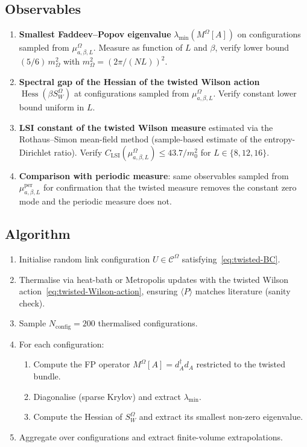 \documentclass[11pt,a4paper]{amsart}
\theoremstyle{definition}
\DeclareMathOperator{\Hess}{Hess}
\begin{document}
\subsection{Observables}
\begin{enumerate}[label=(O\arabic*),leftmargin=2em]
\item \textbf{Smallest Faddeev--Popov eigenvalue} $\lambda_{\min}(M^\Omega[A])$
on configurations sampled from $\mu^\Omega_{a,\beta,L}$. Measure as
function of $L$ and $\beta$, verify lower bound $(5/6)\,m_\Omega^2$
with $m_\Omega^2 = (2\pi/(NL))^2$.
\item \textbf{Spectral gap of the Hessian of the twisted Wilson action}
$\Hess(\beta S_W^\Omega)$ at configurations sampled from
$\mu^\Omega_{a,\beta,L}$. Verify constant lower bound uniform in $L$.
\item \textbf{LSI constant of the twisted Wilson measure} estimated via
the Rothaus--Simon mean-field method (sample-based estimate of the
entropy-Dirichlet ratio). Verify $C_\mathrm{LSI}(\mu^\Omega_{a,\beta,L})
\leq 43.7 / m_0^2$ for $L \in \{8,12,16\}$.
\item \textbf{Comparison with periodic measure}: same observables
sampled from $\mu^\mathrm{per}_{a,\beta,L}$ for confirmation that the
twisted measure removes the constant zero mode and the periodic measure
does not.
\end{enumerate}

\subsection{Algorithm}
\begin{enumerate}[label=\arabic*.,leftmargin=2em]
\item Initialise random link configuration $U \in \mathcal C^\Omega$
satisfying~\eqref{eq:twisted-BC}.
\item Thermalise via heat-bath or Metropolis updates with the twisted
Wilson action~\eqref{eq:twisted-Wilson-action}, ensuring
$\langle P\rangle$ matches literature (sanity check).
\item Sample $N_\mathrm{config} = 200$ thermalised configurations.
\item For each configuration:
\begin{enumerate}[label=(\alph*),leftmargin=2em]
\item Compute the FP operator $M^\Omega[A] = d_A^\dagger d_A$
restricted to the twisted bundle.
\item Diagonalise (sparse Krylov) and extract $\lambda_{\min}$.
\item Compute the Hessian of $S_W^\Omega$ and extract its smallest
non-zero eigenvalue.
\end{enumerate}
\item Aggregate over configurations and extract finite-volume
extrapolations.
\end{enumerate}
\end{document}

